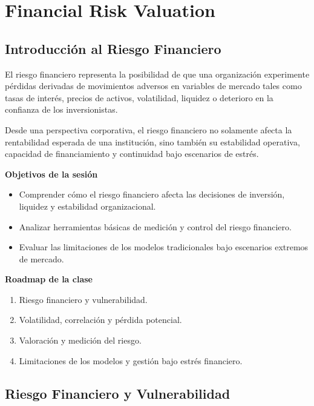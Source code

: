 \chapter{Financial Risk Valuation}

\section{Introducción al Riesgo Financiero}

El riesgo financiero representa la posibilidad de que una organización experimente pérdidas derivadas de movimientos adversos en variables de mercado tales como tasas de interés, precios de activos, volatilidad, liquidez o deterioro en la confianza de los inversionistas.

Desde una perspectiva corporativa, el riesgo financiero no solamente afecta la rentabilidad esperada de una institución, sino también su estabilidad operativa, capacidad de financiamiento y continuidad bajo escenarios de estrés.

\vspace{0.3cm}

\textbf{Objetivos de la sesión}

\begin{itemize}
    \item Comprender cómo el riesgo financiero afecta las decisiones de inversión, liquidez y estabilidad organizacional.
    \item Analizar herramientas básicas de medición y control del riesgo financiero.
    \item Evaluar las limitaciones de los modelos tradicionales bajo escenarios extremos de mercado.
\end{itemize}

\vspace{0.3cm}

\textbf{Roadmap de la clase}

\begin{enumerate}
    \item Riesgo financiero y vulnerabilidad.
    \item Volatilidad, correlación y pérdida potencial.
    \item Valoración y medición del riesgo.
    \item Limitaciones de los modelos y gestión bajo estrés financiero.
\end{enumerate}

\section{Riesgo Financiero y Vulnerabilidad}

